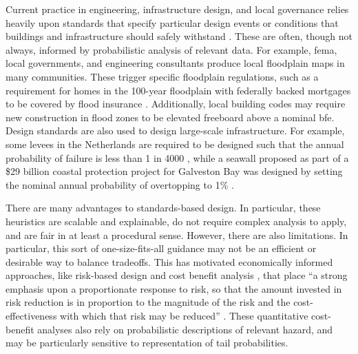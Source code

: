 \documentclass[11pt]{article}
\begin{document}
Current practice in engineering, infrastructure design, and local governance relies heavily upon standards that specify particular design events or conditions that buildings and infrastructure should safely withstand \citep{asce_7-10:2013,bruneau_multihazard:2017}.
These are often, though not always, informed by probabilistic analysis of relevant data.
For example, \gls{fema}, local governments, and engineering consultants produce local floodplain maps in many communities.
These trigger specific floodplain regulations, such as a requirement for homes in the 100-year floodplain with federally backed mortgages to be covered by flood insurance \citep{kousky_voucher:2014}.
Additionally, local building codes \citep[based on guidance such as][]{asce_24-05:2006,FEMA_p-55:2011} may require new construction in flood zones to be elevated freeboard above a nominal \gls{bfe}.
Design standards are also used to design large-scale infrastructure.
For example, some levees in the Netherlands are required to be designed such that the annual probability of failure is less than 1 in \num{4000} \citep{eijgenraam_flooding:2014}, while a seawall proposed as part of a \$29 billion coastal protection project for  Galveston Bay was designed by setting the nominal annual probability of overtopping to 1\% \citep[Appendix D.,~p.~2-59]{USACE_coastal:2021}.

There are many advantages to standards-based design.
In particular, these heuristics are scalable and explainable, do not require complex analysis to apply, and are fair in at least a procedural sense.
However, there are also limitations.
In particular, this sort of one-size-fits-all guidance may not be an efficient or desirable way to balance tradeoffs.
This has motivated economically informed approaches, like risk-based design and cost benefit analysis \citep{eijgenraam_flooding:2014,vandantzig_dike:1956,xian_elevation:2017}, that place ``a strong emphasis upon a proportionate response to risk, so that the amount invested in risk reduction is in proportion to the magnitude of the risk and the cost-effectiveness with which that risk may be reduced'' \citep{merz_fluvial:2010}.
These quantitative cost-benefit analyses also rely on probabilistic descriptions of relevant hazard, and may be particularly sensitive to representation of tail probabilities.
\end{document}
